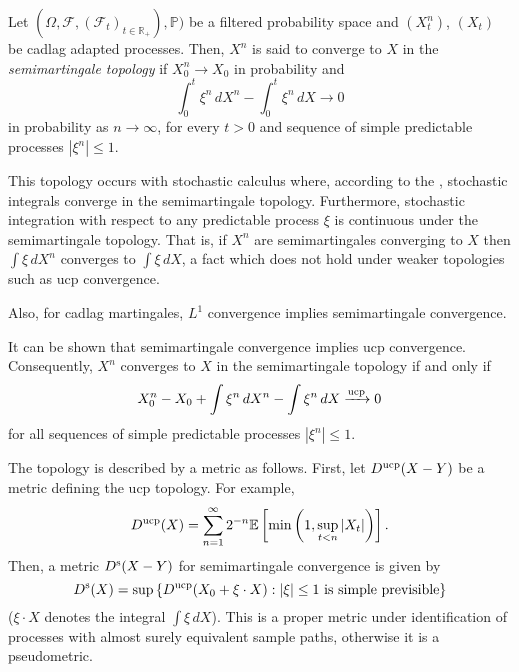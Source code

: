 \documentclass[12pt]{article}
\begin{document}

Let $(\Omega,\mathcal{F},(\mathcal{F}_t)_{t\in\mathbb{R}_+}),\mathbb{P})$ be a filtered probability space and $(X^n_t)$, $(X_t)$ be cadlag adapted processes.
Then, $X^n$ is said to converge to $X$ in the \emph{semimartingale topology} if $X^n_0\rightarrow X_0$ in probability and
\begin{equation*}
\int_0^t\xi^n\,dX^n-\int_0^t\xi^n\,dX\rightarrow 0
\end{equation*}
in probability as $n\rightarrow\infty$, for every $t>0$ and sequence of simple predictable processes $|\xi^n|\le 1$.

This topology occurs with stochastic calculus where, according to the , stochastic integrals converge in the semimartingale topology.
Furthermore, stochastic integration with respect to any  predictable process $\xi$ is continuous under the semimartingale topology. That is, if $X^n$ are semimartingales converging to $X$ then $\int\xi\,dX^n$ converges to $\int\xi\,dX$, a fact which does not hold under weaker topologies such as ucp convergence.

Also, for cadlag martingales, $L^1$ convergence implies semimartingale convergence.

It can be shown that semimartingale convergence implies ucp convergence. Consequently, $X^n$ converges to $X$ in the semimartingale topology if and only if
\begin{equation*}
X^n_0-X_0+\int\xi^n\,dX^n-\int\xi^n\,dX\xrightarrow{\rm ucp} 0
\end{equation*}
for all sequences of simple predictable processes $|\xi^n|\le 1$.

The topology is described by a metric as follows. First, let $D^{\rm ucp}(X-Y)$ be a metric defining the ucp topology. For example,
\begin{equation*}
D^{\rm ucp}(X)=\sum_{n=1}^\infty 2^{-n}\mathbb{E}\left[\min\left(1,\sup_{t<n}|X_t|\right)\right].
\end{equation*}
Then, a metric $D^{\rm s}(X-Y)$ for semimartingale convergence is given by
\begin{equation*}
D^{\rm s}(X)=\sup\left\{D^{\rm ucp}(X_0+\xi\cdot X):|\xi|\le 1\textrm{ is simple previsible}\right\}
\end{equation*}
($\xi\cdot X$ denotes the integral $\int\xi\,dX$). This is a proper metric under identification of processes with almost surely equivalent sample paths, otherwise it is a pseudometric.
\end{document}
